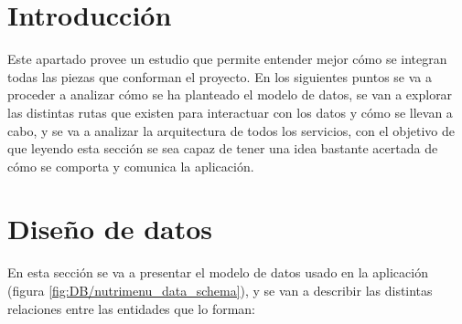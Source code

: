 
\section{Introducción}

Este apartado provee un estudio que permite entender mejor cómo se integran todas las piezas que conforman el proyecto. En los siguientes puntos se va a proceder a analizar cómo se ha planteado el modelo de datos, se van a explorar las distintas rutas que existen para interactuar con los datos y cómo se llevan a cabo, y se va a analizar la arquitectura de todos los servicios, con el objetivo de que leyendo esta sección se sea capaz de tener una idea bastante acertada de cómo se comporta y comunica la aplicación.

\section{Diseño de datos}

En esta sección se va a presentar el modelo de datos usado en la aplicación (figura \ref{fig:DB/nutrimenu_data_schema}), y se van a describir las distintas relaciones entre las entidades que lo forman:

